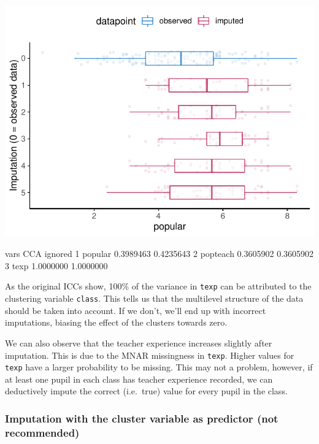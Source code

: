 \documentclass[
]{jss}
\begin{document}
\begin{CodeChunk}


\begin{center}\includegraphics{Manuscript_files/figure-latex/pop_ignored_eval-1} \end{center}

\begin{CodeOutput}
      vars       CCA   ignored
1  popular 0.3989463 0.4235643
2 popteach 0.3605902 0.3605902
3     texp 1.0000000 1.0000000
\end{CodeOutput}
\end{CodeChunk}

As the original ICCs show, 100\% of the variance in \texttt{texp} can be
attributed to the clustering variable \texttt{class}. This tells us that
the multilevel structure of the data should be taken into account. If we
don't, we'll end up with incorrect imputations, biasing the effect of
the clusters towards zero.

We can also observe that the teacher experience increases slightly after
imputation. This is due to the MNAR missingness in \texttt{texp}. Higher
values for \texttt{texp} have a larger probability to be missing. This
may not a problem, however, if at least one pupil in each class has
teacher experience recorded, we can deductively impute the correct
(i.e.~true) value for every pupil in the class.

\hypertarget{imputation-with-the-cluster-variable-as-predictor-not-recommended}{%
\subsubsection{Imputation with the cluster variable as predictor (not
recommended)}\label{imputation-with-the-cluster-variable-as-predictor-not-recommended}}
\end{document}
